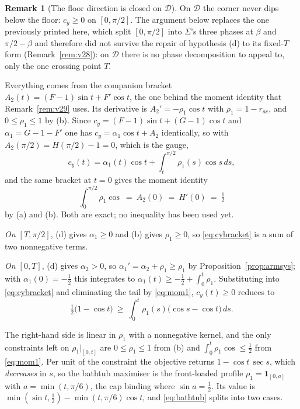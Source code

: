 \documentclass[11pt]{article}
\theoremstyle{definition}
\newtheorem{remark}[theorem]{Remark}
\newcommand{\Sig}{\Sigma}
\begin{document}
\begin{remark}[The floor direction is closed on $\mathcal D$]\label{rem:v24}
On $\mathcal D$ the corner never dips below the floor: $c_y\ge0$ on $[0,\pi/2]$. The
argument below replaces the one previously printed here, which split $[0,\pi/2]$ into
$\Sig$'s three phases at $\beta$ and $\pi/2-\beta$ and therefore did not survive the repair
of hypothesis (d) to its fixed-$T$ form (Remark~\ref{rem:v28}): on $\mathcal D$ there is no
phase decomposition to appeal to, only the one crossing point $T$.

Everything comes from the companion bracket $A_2(t)=(F-1)\sin t+F'\cos t$, the one behind
the moment identity that Remark~\ref{rem:v29} uses. Its derivative is
$A_2'=-\rho_1\cos t$ with $\rho_1=1-r_{ac}$, and
$0\le\rho_1\le1$ by (b). Since $c_y=(F-1)\sin t+(G-1)\cos t$ and $\alpha_1=G-1-F'$ one has
$c_y=\alpha_1\cos t+A_2$ identically, so with $A_2(\pi/2)=H(\pi/2)-1=0$, which is the gauge,
\begin{equation}\label{eq:cybracket}
  c_y(t)=\alpha_1(t)\cos t+\int_t^{\pi/2}\rho_1(s)\cos s\,ds ,
\end{equation}
and the same bracket at $t=0$ gives the moment identity
\begin{equation}\label{eq:mom1}
  \int_0^{\pi/2}\rho_1\cos\ =\ A_2(0)\ =\ H'(0)\ =\ \tfrac12
\end{equation}
by (a) and (b). Both are exact; no inequality has been used yet.

\emph{On $[T,\pi/2]$}, (d) gives $\alpha_1\ge0$ and (b) gives $\rho_1\ge0$, so
\eqref{eq:cybracket} is a sum of two nonnegative terms.

\emph{On $[0,T]$}, (d) gives $\alpha_2>0$, so $\alpha_1'=\alpha_2+\rho_1\ge\rho_1$ by
Proposition~\ref{prop:armsys}; with $\alpha_1(0)=-\tfrac12$ this integrates to
$\alpha_1(t)\ge-\tfrac12+\int_0^t\rho_1$. Substituting into \eqref{eq:cybracket} and
eliminating the tail by \eqref{eq:mom1}, $c_y(t)\ge0$ reduces to
\begin{equation}\label{eq:bathtub}
  \tfrac12\bigl(1-\cos t\bigr)\ \ge\ \int_0^t\rho_1(s)\bigl(\cos s-\cos t\bigr)\,ds .
\end{equation}

The right-hand side is linear in $\rho_1$ with a nonnegative kernel, and the only
constraints left on $\rho_1|_{[0,t]}$ are $0\le\rho_1\le1$ from (b) and
$\int_0^t\rho_1\cos\le\tfrac12$ from \eqref{eq:mom1}. Per unit of the constraint the
objective returns $1-\cos t\,\sec s$, which \emph{decreases} in $s$, so the bathtub maximiser
is the front-loaded profile $\rho_1=\mathbf 1_{[0,a]}$ with $a=\min(t,\pi/6)$, the cap
binding where $\sin a=\tfrac12$. Its value is $\min(\sin t,\tfrac12)-\min(t,\pi/6)\cos t$,
and \eqref{eq:bathtub} splits into two cases.


\end{remark}
\end{document}
